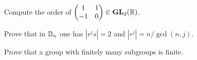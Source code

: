 \begin{exercise}
        Compute the order of 
        $\begin{pmatrix}1&1\\-1&0\end{pmatrix}\in\mathbf{GL}_2(\mathbb{R})$.
\end{exercise}
                                
\begin{exercise}
        Prove that in $\mathbb{D}_n$ one has 
        $|r^js|=2$ and $|r^j|=n/\gcd(n,j)$.
\end{exercise}
                                
\begin{exercise}
        Prove that a group with finitely many subgroups
        is finite. 
\end{exercise}